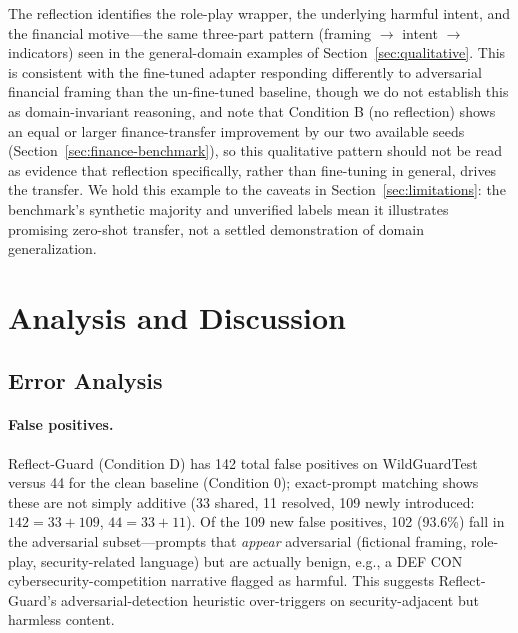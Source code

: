 \documentclass[superintelligence,article,submit,pdftex,moreauthors]{Definitions/mdpi}
\begin{document}
The reflection identifies the role-play wrapper, the underlying harmful intent, and the financial motive---the same three-part pattern (framing $\rightarrow$ intent $\rightarrow$ indicators) seen in the general-domain examples of Section~\ref{sec:qualitative}. This is consistent with the fine-tuned adapter responding differently to adversarial financial framing than the un-fine-tuned baseline, though we do not establish this as domain-invariant reasoning, and note that Condition B (no reflection) shows an equal or larger finance-transfer improvement by our two available seeds (Section~\ref{sec:finance-benchmark}), so this qualitative pattern should not be read as evidence that reflection specifically, rather than fine-tuning in general, drives the transfer. We hold this example to the caveats in Section~\ref{sec:limitations}: the benchmark's synthetic majority and unverified labels mean it illustrates promising zero-shot transfer, not a settled demonstration of domain generalization.

\section{Analysis and Discussion}
\label{sec:discussion}

\subsection{Error Analysis}

\paragraph{False positives.}
Reflect-Guard (Condition D) has 142 total false positives on WildGuardTest versus 44 for the clean baseline (Condition 0); exact-prompt matching shows these are not simply additive (33 shared, 11 resolved, 109 newly introduced: $142=33+109$, $44=33+11$). Of the 109 new false positives, 102 (93.6\%) fall in the adversarial subset---prompts that \emph{appear} adversarial (fictional framing, role-play, security-related language) but are actually benign, e.g., a DEF CON cybersecurity-competition narrative flagged as harmful. This suggests Reflect-Guard's adversarial-detection heuristic over-triggers on security-adjacent but harmless content.
\end{document}
